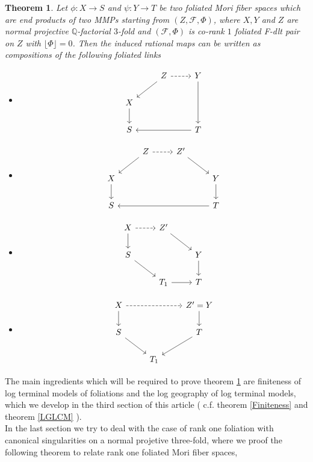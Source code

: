 \documentclass[12pt]{amsart}%
\theoremstyle{plain}
\newtheorem{theorem}{Theorem}[section]
\theoremstyle{remark}
\theoremstyle{definition}
\newcommand{\<}{\leq}
\newcommand{\mbQ}{\mathbb{Q}}
\theoremstyle{definition}
\theoremstyle{definition}
\numberwithin{equation}{section}
\theoremstyle{remark}
\begin{document}
\begin{theorem}\label{MT}
 Let $\phi:X\rightarrow S$ and $\psi: Y\rightarrow T$ be two foliated Mori fiber spaces which are end products of two MMPs starting from $(Z,\mathcal{F},\Phi)$, where $X,Y$ and $Z$ are normal projective $\mbQ$-factorial $3$-fold and $(\mathcal{F},\Phi)$ is co-rank $1$ foliated F-dlt pair on $Z$ with $\lfloor \Phi\rfloor =0$. Then the induced rational maps can be written as compositions of the following foliated links
 \begin{itemize}
     \item \[
 \begin{tikzcd}
& Z \arrow[r, dashrightarrow] \arrow{ld}&  Y\arrow{dd}\\
X \arrow{d}& &  \\
S & &  T\arrow{ll}
\end{tikzcd}
\] 
\item  \[
 \begin{tikzcd}
& Z \arrow[r, dashrightarrow] \arrow{ld}&  Z'\arrow{rd}&\\
X \arrow{d}& & & Y \arrow{d}\\
S & & & T \arrow{lll}
\end{tikzcd}
\] 
\item \[
 \begin{tikzcd}
X \arrow[r, dashrightarrow] \arrow{d} & Z' \arrow{rd}\\
S  \arrow{rd}& & Y \arrow{d}\\
&T_1 \arrow{r} & T
\end{tikzcd}
\]
\item \[
 \begin{tikzcd}
X \arrow[rr, dashrightarrow] \arrow{d}& & Z'=Y \arrow{d}\\
S  \arrow{rd}& & T \arrow{ld}\\
&T_1  & 
\end{tikzcd}
\]
 \end{itemize}
   
\end{theorem}
 The main ingredients which will be required to prove theorem \ref{MT} are finiteness of log terminal models of foliations and the log geography of log terminal models, which we develop in the third section of this article ( c.f. theorem \ref{Finiteness} and theorem \ref{LGLCM} ).\\ 
In the last section we try to deal with the case of rank one foliation with canonical singularities on a normal projetive three-fold, where we proof the following theorem to relate rank one foliated Mori fiber spaces,
\end{document}
